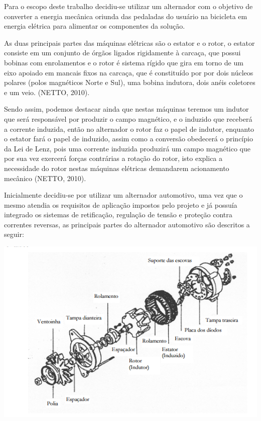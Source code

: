 Para o escopo deste trabalho decidiu-se utilizar um alternador com o objetivo de converter a energia mecânica oriunda das pedaladas do usuário na bicicleta em energia elétrica para alimentar os componentes da solução.

As duas principais partes das máquinas elétricas são o estator e o rotor, o estator consiste em um conjunto de órgãos ligados rigidamente à carcaça, que possui bobinas com enrolamentos e o rotor é sistema rígido que gira em torno de um eixo apoiado em mancais fixos na carcaça, que é constituído por por dois núcleos polares (polos magnéticos Norte e Sul),  uma bobina indutora, dois anéis coletores e um veio. (NETTO, 2010). 

Sendo assim, podemos destacar ainda que nestas máquinas teremos um indutor que será responsável por produzir o campo magnético, e o induzido que receberá a corrente induzida, então no alternador o rotor faz o papel de indutor, enquanto o estator fará o papel de induzido, assim como a conversão obedecerá o princípio da Lei de Lenz, pois uma corrente induzida produzirá um campo magnético que por sua vez exercerá forças contrárias a rotação do rotor, isto explica a necessidade do rotor nestas máquinas elétricas demandarem acionamento mecânico (NETTO, 2010). 

Inicialmente decidiu-se por utilizar um alternador automotivo, uma vez que o mesmo atendia os requisitos de aplicação impostos pelo projeto e já possuía integrado os sistemas de retificação, regulação de tensão e proteção contra correntes reversas, as principais partes do alternador automotivo são descritos a seguir:

 \begin{center}
    	\includegraphics[scale=0.7]{figuras/partes}
        \label{partes}
    \end{center}


